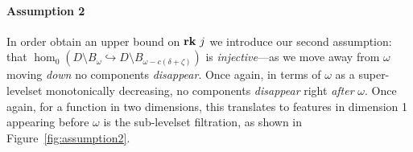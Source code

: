 \paragraph{Assumption 2}

In order obtain an upper bound on $\mathbf{rk}~j$ we introduce our second assumption: that $\hom_0(D\setminus B_\omega\hookrightarrow D\setminus B_{\omega-c(\delta+\zeta)})$ is \emph{injective}---as we move away from $\omega$ moving \emph{down} no components \emph{disappear}.
Once again, in terms of $\omega$ as a super-levelset monotonically decreasing, no components \emph{disappear} right \emph{after} $\omega$.
Once again, for a function in two dimensions, this translates to features in dimension 1 appearing before $\omega$ is the sub-levelset filtration, as shown in Figure~\ref{fig:assumption2}.


